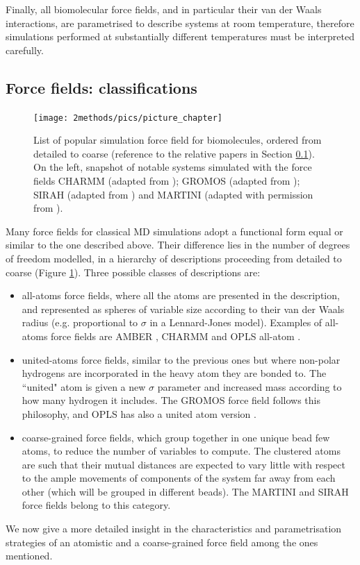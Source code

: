 Finally, all biomolecular force fields, and in particular their van der Waals interactions, are parametrised to describe systems at room temperature, therefore simulations performed at substantially different temperatures must be interpreted carefully.


\subsection{Force fields: classifications} \label{sec:ff_ex}

\begin{figure}
\centering
\texttt{[image: 2methods/pics/picture\_chapter]}
%
\caption[Scheme of popular simulation force field for biomolecules]{List of popular simulation force field for biomolecules, ordered from detailed to coarse (reference to the relative papers in Section \ref{sec:ff_ex}). On the left, snapshot of notable systems simulated with the force fields CHARMM (adapted from \citet{Lipkin2017}); GROMOS (adapted from \citet{Macpherson2019}); SIRAH (adapted from \citet{Machado2017}) and MARTINI (adapted with permission from \citet{Samsudin2017}).}
\label{fig:ff}
\end{figure}

Many force fields for classical MD simulations adopt a functional form equal or similar to the one described above. Their difference lies in the number of degrees of freedom modelled, in a hierarchy of descriptions proceeding from detailed to coarse (Figure \ref{fig:ff}). Three possible classes of descriptions are:
\begin{itemize}
\item all-atoms force fields, where all the atoms are presented in the description, and represented as spheres of variable size according to their van der Waals radius (e.g. proportional to $\sigma$ in a Lennard-Jones model). Examples of all-atoms force fields are AMBER \cite{Maier2015,Dickson2014,Wang2004_amber}, CHARMM \cite{MacKerell1998,Klauda2010,Huang2013} and OPLS all-atom \cite{Jorgensen1988}.
\item united-atoms force fields, similar to the previous ones but where non-polar hydrogens are incorporated in the heavy atom they are bonded to. The ``united" atom is given a new $\sigma$ parameter and increased mass according to how many hydrogen it includes. The GROMOS force field \cite{Oostenbrink2004,Schmid2011} follows this philosophy, and OPLS has also a united atom version \cite{Jorgensen1996}.
\item coarse-grained force fields, which group together in one unique bead few atoms, to reduce the number of variables to compute. The clustered atoms are such that their mutual distances are expected to vary little with respect to the ample movements of components of the system far away from each other (which will be grouped in different beads). The MARTINI \cite{Marrink2007,Monticelli2008,DeJong2013} and SIRAH \cite{Machado2018,Barrera2019} force fields belong to this category.
\end{itemize}
%
We now give a more detailed insight in the characteristics and parametrisation strategies of an atomistic and a coarse-grained force field among the ones mentioned.


